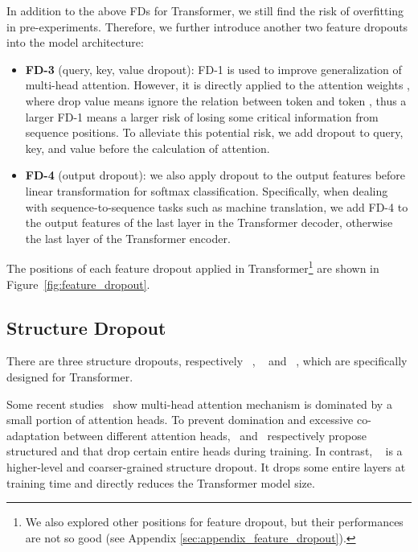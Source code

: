 \documentclass[11pt]{article}
\begin{document}
In addition to the above FDs for Transformer, we still find the risk of overfitting in pre-experiments. Therefore, we further introduce another two feature dropouts into the model architecture:



\begin{itemize}
    \item \textbf{FD-3} (query, key, value dropout): FD-1 is used to improve generalization of multi-head attention. However, it is directly applied to the attention weights , where drop value  means ignore the relation between token  and token , thus a larger FD-1 means a larger risk of losing some critical information from sequence positions. To alleviate this potential risk, we add dropout to query, key, and value before the calculation of attention.


    \item \textbf{FD-4} (output dropout): we also apply dropout to the output features before linear transformation for softmax classification. Specifically, when dealing with sequence-to-sequence tasks such as machine translation, we add FD-4 to the output features of the last layer in the Transformer decoder, otherwise the last layer of the Transformer encoder.
\end{itemize}

The positions of each feature dropout applied in Transformer\footnote{We also explored other positions for feature dropout, but their performances are not so good (see Appendix \ref{sec:appendix_feature_dropout}).} are shown in Figure~\ref{fig:feature_dropout}. 



\subsection{Structure Dropout}
There are three structure dropouts, respectively ~\cite{fan2019reducing}, ~\cite{zhou2020scheduled} and ~\cite{DBLP:journals/corr/abs-2009-09672}, which are specifically designed for Transformer.


 Some recent studies~\cite{DBLP:conf/acl/VoitaTMST19,DBLP:conf/nips/MichelLN19} show multi-head attention mechanism is dominated by a small portion of attention heads. To prevent domination and excessive co-adaptation between different attention heads,~\citet{zhou2020scheduled} and~\citet{DBLP:journals/corr/abs-2009-09672} respectively propose structured  and  that drop certain entire heads during training. In contrast, ~\cite{fan2019reducing} is a higher-level and coarser-grained structure dropout. It drops some entire layers at training time and directly reduces the Transformer model size.
\end{document}

